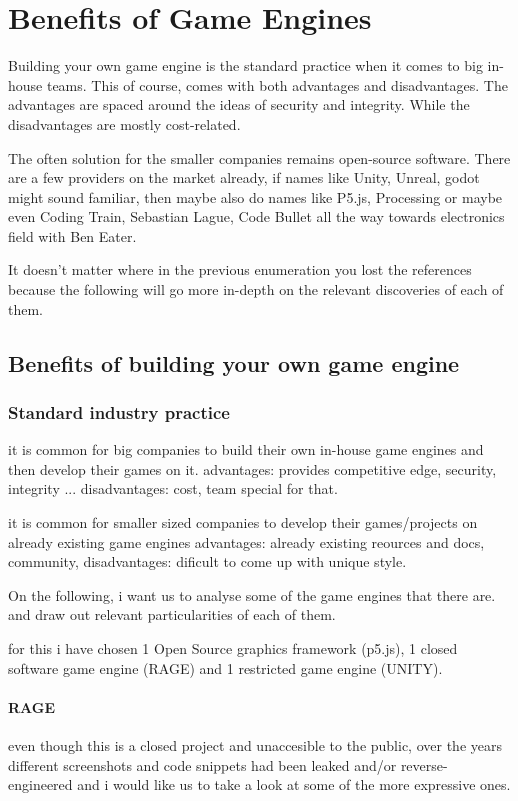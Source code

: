
\chapter*{Benefits of Game Engines}
  Building your own game engine is the standard practice when it comes to big in-house teams. 
  This of course, comes with both advantages and disadvantages.
  The advantages are spaced around the ideas of security and integrity.
  While the disadvantages are mostly cost-related.

  The often solution for the smaller companies remains open-source software.
  There are a few providers on the market already, if names like Unity, Unreal, godot might sound familiar, then maybe also do names like P5.js, Processing or maybe even Coding Train, Sebastian Lague, Code Bullet all the way towards electronics field with Ben Eater. 

  It doesn't matter where in the previous enumeration you lost the references because the following will go more in-depth on the relevant discoveries of each of them.


  \section*{Benefits of building your own game engine}
      \subsection*{Standard industry practice}
          it is common for big companies to build their own in-house game engines and then develop their games on it.
          advantages:     provides competitive edge, security, integrity ...
          disadvantages:  cost, team special for that.

          it is common for smaller sized companies to develop their games/projects on already existing game engines  
          advantages:     already existing reources and docs, community, 
          disadvantages:  dificult to come up with unique style.

          On the following, i want us to analyse some of the game engines that there are. and draw out relevant particularities of each of them.

          for this i have chosen 1 Open Source graphics framework (p5.js), 1 closed software game engine (RAGE) and 1 restricted game engine (UNITY).

          \subsubsection*{RAGE}
              even though this is a closed project and unaccesible to the public, over the years different screenshots and code snippets had been leaked and/or reverse-engineered and i would like us to take a look at some of the more expressive ones.

